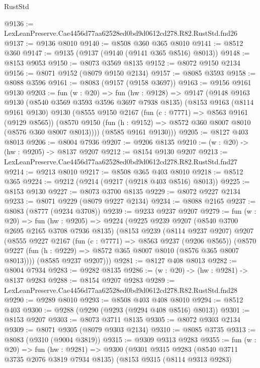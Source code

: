 \begin{lexlean}{RustStd}
\begin{coremodule}
@9136 := LexLeanPreserve.Cae4456d77aa62528ed0bd9d0612cd278.R82.RustStd.fnd26
@9137 := @9136 @8010
@9140 := @8508 @360 @365 @8010
@9141 := @8512 @360
@9147 := @9135 (@9137 (@9140 (@9141 @365 @8516) @8013))
@9148 := @8153 @9053
@9150 := @8073 @3569 @8135
@9152 := @8072 @9150 @2134
@9156 := @8071 @9152 (@8079 @9150 @2134)
@9157 := @8085 @3593
@9158 := @8088 @3596
@9161 := @8083 (@9157 (@9158 @3697))
@9163 := @9156 @9161 @9130
@9203 := fun (w : @20) =>
  fun (hw : @9128) =>
  @9147
    (@9148
      @9163
      @9130
      (@8540 @3569 @3593 @3596 @3697 @7938 @8135)
      (@8153
        @9163
        (@8114 @9161 @9130)
        @9130
        (@8555
          @9150
          @2167
          (fun (c : @7771) => @8563 @9161 (@9129 @8565))
          (@8570 @9150 (fun (h : @9152) => @8572 @360 @8007 @8010 (@8576 @360 @8007 @8013))))
        (@8585 @9161 @9130)))
@9205 := @8127 @403 @8013
@9206 := @8004 @7936
@9207 := @9206 @8135
@9210 := (w : @20) -> (hw : @9205) -> @8137 @9207
@9212 := @8154 @9130 @9207
@9213 := LexLeanPreserve.Cae4456d77aa62528ed0bd9d0612cd278.R82.RustStd.fnd27
@9214 := @9213 @8010
@9217 := @8508 @365 @403 @8010
@9218 := @8512 @365
@9224 := @9212 (@9214 (@9217 (@9218 @403 @8516) @8013))
@9225 := @8153 @9130
@9227 := @8073 @3700 @8135
@9229 := @8072 @9227 @2134
@9233 := @8071 @9229 (@8079 @9227 @2134)
@9234 := @8088 @2165
@9237 := @8083 (@8777 (@9234 @3708))
@9239 := @9233 @9237 @9207
@9279 := fun (w : @20) =>
  fun (hw : @9205) =>
  @9224
    (@9225
      @9239
      @9207
      (@8540 @3700 @2695 @2165 @3708 @7936 @8135)
      (@8153
        @9239
        (@8114 @9237 @9207)
        @9207
        (@8555
          @9227
          @2167
          (fun (c : @7771) => @8563 @9237 (@9206 @8565))
          (@8570 @9227 (fun (h : @9229) => @8572 @365 @8007 @8010 (@8576 @365 @8007 @8013))))
        (@8585 @9237 @9207)))
@9281 := @8127 @408 @8013
@9282 := @8004 @7934
@9283 := @9282 @8135
@9286 := (w : @20) -> (hw : @9281) -> @8137 @9283
@9288 := @8154 @9207 @9283
@9289 := LexLeanPreserve.Cae4456d77aa62528ed0bd9d0612cd278.R82.RustStd.fnd28
@9290 := @9289 @8010
@9293 := @8508 @403 @408 @8010
@9294 := @8512 @403
@9300 := @9288 (@9290 (@9293 (@9294 @408 @8516) @8013))
@9301 := @8153 @9207
@9303 := @8073 @3711 @8135
@9305 := @8072 @9303 @2134
@9309 := @8071 @9305 (@8079 @9303 @2134)
@9310 := @8085 @3735
@9313 := @8083 (@9310 (@9004 @3819))
@9315 := @9309 @9313 @9283
@9355 := fun (w : @20) =>
  fun (hw : @9281) =>
  @9300
    (@9301
      @9315
      @9283
      (@8540 @3711 @3735 @2076 @3819 @7934 @8135)
      (@8153
        @9315
        (@8114 @9313 @9283)

\end{coremodule}
\end{lexlean}
